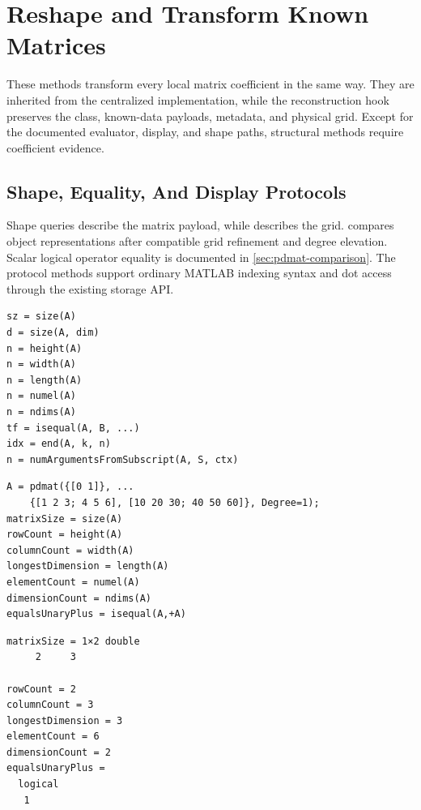 \section{Reshape and Transform Known Matrices}
\label{sec:pdmat-matrix-ops}

These methods transform every local matrix coefficient in the same way. They are inherited from the centralized  implementation, while the  reconstruction hook preserves the  class, known-data payloads, metadata, and physical grid. Except for the documented evaluator, display, and shape paths, structural methods require coefficient evidence.

\subsection{Shape, Equality, And Display Protocols}
\label{sec:pdmat-matrix-shape}
\label{sec:pdmat-matrix-protocol}

Shape queries describe the matrix payload, while  describes the grid.  compares object representations after compatible grid refinement and degree elevation. Scalar logical operator equality is documented in \cref{sec:pdmat-comparison}. The protocol methods support ordinary MATLAB indexing syntax and dot access through the existing storage API.

\syntaxhead
\begin{lstlisting}[style=dpsyntax]
sz = size(A)
d = size(A, dim)
n = height(A)
n = width(A)
n = length(A)
n = numel(A)
n = ndims(A)
tf = isequal(A, B, ...)
idx = end(A, k, n)
n = numArgumentsFromSubscript(A, S, ctx)
\end{lstlisting}

\examplehead
\begin{lstlisting}[style=dpmatlab]
A = pdmat({[0 1]}, ...
    {[1 2 3; 4 5 6], [10 20 30; 40 50 60]}, Degree=1);
matrixSize = size(A)
rowCount = height(A)
columnCount = width(A)
longestDimension = length(A)
elementCount = numel(A)
dimensionCount = ndims(A)
equalsUnaryPlus = isequal(A,+A)
\end{lstlisting}

\begin{lstlisting}[style=dpoutput]
matrixSize = 1×2 double
     2     3

rowCount = 2
columnCount = 3
longestDimension = 3
elementCount = 6
dimensionCount = 2
equalsUnaryPlus =
  logical
   1
\end{lstlisting}

